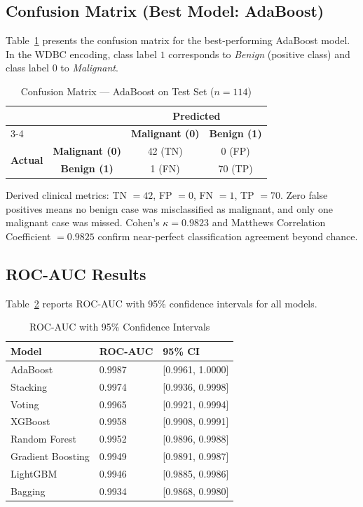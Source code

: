 \documentclass[10pt,letterpaper]{article}
\begin{document}
\subsection{Confusion Matrix (Best Model: AdaBoost)}

Table~\ref{tab:confusion} presents the confusion matrix for the best-performing AdaBoost model.
In the WDBC encoding, class label $1$ corresponds to \emph{Benign} (positive class) and class
label $0$ to \emph{Malignant}.

\begin{table}[h]
\centering
\caption{Confusion Matrix --- AdaBoost on Test Set ($n=114$)}
\label{tab:confusion}
\begin{tabular}{lccc}
\toprule
 & & \multicolumn{2}{c}{\textbf{Predicted}} \\
\cmidrule(lr){3-4}
 & & \textbf{Malignant (0)} & \textbf{Benign (1)} \\
\midrule
\multirow{2}{*}{\textbf{Actual}} & \textbf{Malignant (0)} & 42 (TN) & 0 (FP) \\
                                  & \textbf{Benign (1)}    & 1 (FN)  & 70 (TP) \\
\bottomrule
\end{tabular}
\end{table}

\noindent Derived clinical metrics: TN $= 42$, FP $= 0$, FN $= 1$, TP $= 70$. Zero false
positives means no benign case was misclassified as malignant, and only one malignant case was
missed. Cohen's $\kappa = 0.9823$ and Matthews Correlation Coefficient $= 0.9825$ confirm near-perfect
classification agreement beyond chance.

\subsection{ROC-AUC Results}

Table~\ref{tab:roc} reports ROC-AUC with 95\% confidence intervals for all models.

\begin{table}[h]
\centering
\caption{ROC-AUC with 95\% Confidence Intervals}
\label{tab:roc}
\begin{tabular}{lll}
\toprule
\textbf{Model} & \textbf{ROC-AUC} & \textbf{95\% CI} \\
\midrule
AdaBoost          & 0.9987 & [0.9961, 1.0000] \\
Stacking          & 0.9974 & [0.9936, 0.9998] \\
Voting            & 0.9965 & [0.9921, 0.9994] \\
XGBoost           & 0.9958 & [0.9908, 0.9991] \\
Random Forest     & 0.9952 & [0.9896, 0.9988] \\
Gradient Boosting & 0.9949 & [0.9891, 0.9987] \\
LightGBM          & 0.9946 & [0.9885, 0.9986] \\
Bagging           & 0.9934 & [0.9868, 0.9980] \\
\bottomrule
\end{tabular}
\end{table}
\end{document}
